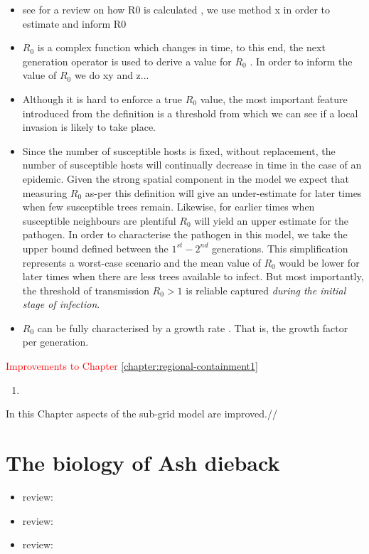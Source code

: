 \begin{itemize}
    \item see for a review on how R0 is calculated \cite{perspectives-on-r0}, we use method x in order to estimate and inform R0
    \item $R_0$ is a complex function which changes in time, to this end, the next generation operator is used to derive a value for $R_0$ \cite{doi:10.1098/rsif.2009.0386}. In order to inform the value of $R_0$ we do xy and z...
    \item Although it is hard to enforce a true $R_0$ value, the most important feature introduced from the definition is a threshold from which we can see if a local invasion is likely to take place.
    \item Since the number of susceptible hosts is fixed, without replacement, the number of susceptible hosts will continually decrease in time in the case of an epidemic. Given the strong spatial component in the model we expect that measuring $R_0$ as-per this definition will give an under-estimate for later times when few susceptible trees remain. Likewise, for earlier times when susceptible neighbours are plentiful $R_0$ will yield an upper estimate for the pathogen. In order to characterise the pathogen in this model, we take the upper bound defined between the $1^{st}-2^{nd}$ generations. This simplification represents a worst-case scenario and the mean value of $R_0$ would be lower for later times when there are less trees available to infect. But most importantly, the threshold of transmission $R_0>1$ is reliable captured \textit{during the initial stage of infection}.
    \item $R_0$ can be fully characterised by a growth rate \cite{R0-construct}. That is, the growth factor per generation.
    
\end{itemize}

\textcolor{red}{Improvements to Chapter \ref{chapter:regional-containment1}}
\begin{enumerate}
    \item
\end{enumerate}

In this Chapter aspects of the sub-grid model are improved.//
\section{The biology of Ash dieback} %
\begin{itemize}
    \item review: \cite{ash-dieback-costs}
    \item review: \cite{doi:10.1111/1365-2745.13383}
    \item review: \cite{ash-tree1}
\end{itemize}

